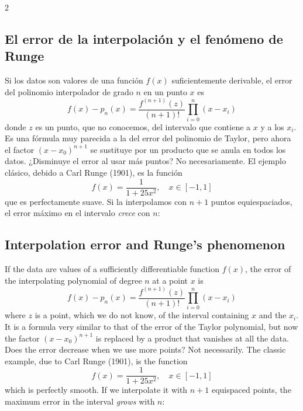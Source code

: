 \begin{paracol}{2}
\subsection{El error de la interpolación y el fenómeno de Runge}\label{sec:runge}
Si los datos son valores de una función $f(x)$ suficientemente derivable, el error del polinomio interpolador de grado $n$ en un punto $x$ es
\begin{equation*}
f(x)-p_n(x)=\frac{f^{(n+1)}(z)}{(n+1)!}\prod_{i=0}^{n}(x-x_i)
\end{equation*}
donde $z$ es un punto, que no conocemos, del intervalo que contiene a $x$ y a los $x_i$. Es una fórmula muy parecida a la del error del polinomio de Taylor, pero ahora el factor $(x-x_0)^{n+1}$ se sustituye por un producto que se anula en todos los datos. ¿Disminuye el error al usar más puntos? No necesariamente. El ejemplo clásico, debido a Carl Runge (1901), es la función
\begin{equation*}
f(x)=\frac{1}{1+25x^2}, \quad x\in[-1,1]
\end{equation*}
que es perfectamente suave. Si la interpolamos con $n+1$ puntos equiespaciados, el error máximo en el intervalo \emph{crece} con $n$:

\switchcolumn
\subsection{Interpolation error and Runge's phenomenon}\label{sec:runge-2}
If the data are values of a sufficiently differentiable function $f(x)$, the error of the interpolating polynomial of degree $n$ at a point $x$ is
\begin{equation*}
f(x)-p_n(x)=\frac{f^{(n+1)}(z)}{(n+1)!}\prod_{i=0}^{n}(x-x_i)
\end{equation*}
where $z$ is a point, which we do not know, of the interval containing $x$ and the $x_i$. It is a formula very similar to that of the error of the Taylor polynomial, but now the factor $(x-x_0)^{n+1}$ is replaced by a product that vanishes at all the data. Does the error decrease when we use more points? Not necessarily. The classic example, due to Carl Runge (1901), is the function
\begin{equation*}
f(x)=\frac{1}{1+25x^2}, \quad x\in[-1,1]
\end{equation*}
which is perfectly smooth. If we interpolate it with $n+1$ equispaced points, the maximum error in the interval \emph{grows} with $n$:
\end{paracol}

